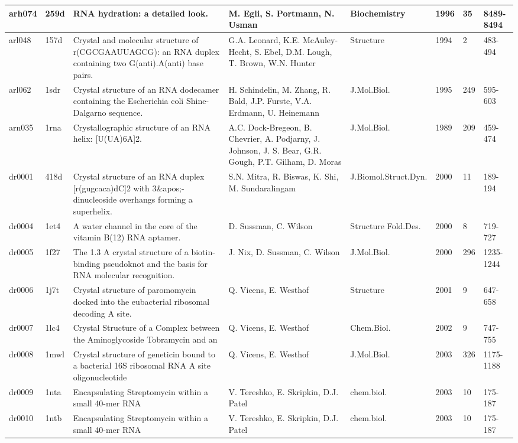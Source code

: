 {\begin{landscape}
\begin{center}
\begin{longtable}{p{0.76cm}   p{0.74cm}  p{5.2cm}   p{5.2cm}  p{3.2cm}
    p{0.6cm} p{0.9cm} p{1.8cm}}
arh074 & 259d & RNA hydration: a detailed look. & M. Egli, S. Portmann, N. Usman & Biochemistry & 1996 & 35 & 8489-8494 \\ \hline
arl048 & 157d & Crystal and molecular structure of r(CGCGAAUUAGCG): an RNA duplex containing two G(anti).A(anti) base pairs. & G.A. Leonard, K.E. McAuley-Hecht, S. Ebel, D.M. Lough, T. Brown, W.N. Hunter & Structure & 1994 & 2 & 483-494 \\ \hline
arl062 & 1sdr & Crystal structure of an RNA dodecamer containing the Escherichia coli Shine-Dalgarno sequence. & H. Schindelin, M. Zhang, R. Bald, J.P. Furste, V.A. Erdmann, U. Heinemann & J.Mol.Biol. & 1995 & 249 & 595-603 \\ \hline
arn035 & 1rna & Crystallographic structure of an RNA helix: [U(UA)6A]2. & A.C. Dock-Bregeon, B. Chevrier, A. Podjarny, J. Johnson, J. S. Bear, G.R. Gough, P.T. Gilham, D. Moras & J.Mol.Biol. & 1989 & 209 & 459-474 \\ \hline
dr0001 & 418d & Crystal structure of an RNA duplex [r(gugcaca)dC]2 with 3\&apos;-dinucleoside overhangs forming a superhelix. & S.N. Mitra, R. Biswas, K. Shi, M. Sundaralingam & J.Biomol.Struct.Dyn. & 2000 & 11 & 189-194 \\ \hline
dr0004 & 1et4 & A water channel in the core of the vitamin B(12) RNA aptamer. & D. Sussman, C. Wilson & Structure Fold.Des. & 2000 & 8 & 719-727 \\ \hline
dr0005 & 1f27 & The 1.3 A crystal structure of a biotin-binding pseudoknot and the basis for RNA molecular recognition. & J. Nix, D. Sussman, C. Wilson & J.Mol.Biol. & 2000 & 296 & 1235-1244 \\ \hline
dr0006 & 1j7t & Crystal structure of paromomycin docked into the eubacterial ribosomal decoding A site. & Q. Vicens, E. Westhof & Structure & 2001 & 9 & 647-658 \\ \hline
dr0007 & 1lc4 & Crystal Structure of a Complex between the Aminoglycoside Tobramycin and an   & Q. Vicens, E. Westhof & Chem.Biol. & 2002 & 9 & 747-755 \\ \hline
dr0008 & 1mwl & Crystal structure of geneticin bound to a bacterial 16S ribosomal RNA A site oligonucleotide & Q. Vicens, E. Westhof & J.Mol.Biol. & 2003 & 326 & 1175-1188 \\ \hline
dr0009 & 1nta & Encapsulating Streptomycin within a small 40-mer RNA & V. Tereshko, E. Skripkin, D.J. Patel & chem.biol. & 2003 & 10 & 175-187 \\ \hline
dr0010 & 1ntb & Encapsulating Streptomycin within a small 40-mer RNA & V. Tereshko, E. Skripkin, D.J. Patel & chem.biol. & 2003 & 10 & 175-187 \\ \hline

\end{longtable}
\end{center}
\end{landscape}}
